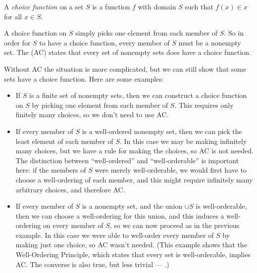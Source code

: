 \documentclass[12pt]{article}
\begin{document}

A \emph{choice function} on a set $S$ is a function $f$ with domain $S$ such that $f(x)\in x$ for all $x\in S$.

A choice function on $S$ simply picks one element from each member of $S$. So in order for $S$ to have a choice function, every member of $S$ must be a nonempty set. The  (AC) states that every set of nonempty sets does have a choice function.

Without AC the situation is more complicated, but we can still show that some sets have a choice function. Here are some examples:
\begin{itemize}
\item If $S$ is a finite set of nonempty sets, then we can construct a choice function on $S$ by picking one element from each member of $S$. This requires only finitely many choices, so we don't need to use AC.
\item If every member of $S$ is a well-ordered nonempty set, then we can pick the least element of each member of $S$. In this case we may be making infinitely many choices, but we have a rule for making the choices, so AC is not needed. The distinction between ``well-ordered'' and ``well-orderable'' is important here: if the members of $S$ were merely well-orderable, we would first have to choose a well-ordering of each member, and this might require infinitely many arbitrary choices, and therefore AC.
\item If every member of $S$ is a nonempty set, and the union $\cup S$ is well-orderable, then we can choose a well-ordering for this union, and this induces a well-ordering on every member of $S$, so we can now proceed as in the previous example. In this case we were able to well-order every member of $S$ by making just one choice, so AC wasn't needed. (This example shows that the Well-Ordering Principle, which states that every set is well-orderable, implies AC. The converse is also true, but less trivial --- .)
\end{itemize}
\end{document}
